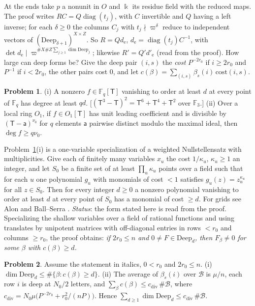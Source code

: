 \documentclass[reqno]{amsart}
\numberwithin{equation}{section}
\theoremstyle{plain}
\theoremstyle{definition}
\newtheorem{problem}{Problem}[section]
\theoremstyle{remark}
\newcommand{\F}{\mathbb{F}}
\newcommand{\Bc}{\mathcal B}
\newcommand{\Deep}{\mathrm{Deep}}
\newcommand{\cdiv}{c_{\mathrm{div}}}
\begin{document}
At the ends take \(p\) a nonunit in \(O\) and \(\Bbbk\) its residue field with the reduced maps.  The proof writes \(RC = Q\operatorname{diag}(t_j)\), with \(C\) invertible and \(Q\) having a left inverse; for each \(\delta \ge 0\) the columns \(C_j\) with \(t_j \nmid \varpi^\delta\) reduce to independent vectors of \((\Deep_{\delta+1})^{X \times Z}\).  So \(R = Qd_{\mathrm e}\), \(d_{\mathrm e} = \operatorname{diag}(t_j)C^{-1}\), with \(\det d_{\mathrm e} \mid \varpi^{\#X\#Z\sum_{j \ge 1}\dim\Deep_j}\); likewise \(R' = Q'd'_{\mathrm e}\) (read from the proof).  How large can deep forms be?  Give the deep pair \((i, s)\) the \emph{cost} \(P^{-2r_0}\) if \(i \ge 2r_0\) and \(P^{-1}\) if \(i < 2r_0\), the other pairs cost \(0\), and let \(c(\beta) = \sum_{(i,s)} \beta_s(i)\,\mathrm{cost}(i, s)\).

\begin{problem}\label{pr:one-variable}
(i) A nonzero \(f \in \F_q[\mathsf T]\) vanishing to order at least \(d\) at every point of \(\F_q\) has degree at least \(qd\).  [\((\mathsf T^3 - \mathsf T)^2 = \mathsf T^6 + \mathsf T^4 + \mathsf T^2\) over \(\F_3\).]  (ii) Over a local ring \(O_1\), if \(f \in O_1[\mathsf T]\) has unit leading coefficient and is divisible by \((\mathsf T - \mathsf a)^{\nu_0}\) for \(q\) elements \(\mathsf a\) pairwise distinct modulo the maximal ideal, then \(\deg f \ge q\nu_0\).
\end{problem}

Problem~\ref{pr:one-variable}(i) is a one-variable specialization of a weighted Nullstellensatz with multiplicities.  Give each of finitely many variables \(x_u\) the cost \(1/\kappa_u\), \(\kappa_u \ge 1\) an integer, and let \(S_0\) be a finite set of at least \(\prod_u\kappa_u\) points over a field such that for each \(u\) one polynomial \(g_u\) with monomials of cost \(< 1\) satisfies \(g_u(z) = z_u^{\kappa_u}\) for all \(z \in S_0\).  Then for every integer \(d \ge 0\) a nonzero polynomial vanishing to order at least \(d\) at every point of \(S_0\) has a monomial of cost \(\ge d\).  For grids see Alon \cite{Al} and Ball--Serra \cite{BS}.  \emph{Status}: the form stated here is read from the proof.  Specializing the shallow variables over a field of rational functions and using translates by unipotent matrices with off-diagonal entries in rows \(< r_0\) and columns \(\ge r_0\), the proof obtains: \emph{if \(2r_0 \le n\) and \(0 \ne F \in \Deep_d\), then \(F_\beta \ne 0\) for some \(\beta\) with \(c(\beta) \ge d\).}

\begin{problem}\label{pr:deep-count}
Assume the statement in italics, \(0 < r_0\) and \(2r_0 \le n\).  (i) \(\dim\Deep_d \le \#\{\beta : c(\beta) \ge d\}\).  (ii) The average of \(\beta_s(i)\) over \(\Bc\) is \(\mu/n\), each row \(i\) is deep at \(N_0/2\) letters, and \(\sum_\beta c(\beta) \le \cdiv\,\#\Bc\), where \(\cdiv = N_0\mu\bigl(P^{-2r_0} + r_0^2/(nP)\bigr)\).  Hence \(\sum_{d \ge 1}\dim\Deep_d \le \cdiv\,\#\Bc\).
\end{problem}
\end{document}

